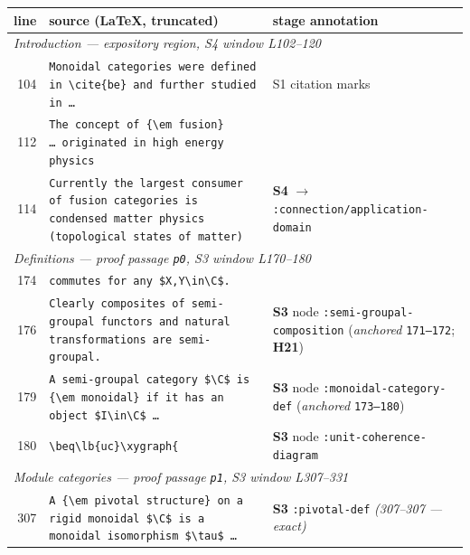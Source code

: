 \begin{center}
\small
\begin{tabular}{r|p{}|p{}}
\textbf{line} & \textbf{source (\LaTeX, truncated)} & \textbf{stage annotation}\\
\hline
\multicolumn{3}{l}{\emph{\quad Introduction --- expository region, S4 window L102--120}}\\
\hline
104 & \texttt{Monoidal categories were defined in \textbackslash cite\{be\} and further studied in \dots} & S1 citation marks\\
112 & \texttt{The concept of \{\textbackslash em fusion\} \dots\ originated in high energy physics} & \\
114 & \texttt{Currently the largest consumer of fusion categories is condensed matter physics (topological states of matter)} & \textbf{S4} $\to$ \texttt{:connection/}\linebreak\texttt{application-domain}\\
\hline
\multicolumn{3}{l}{\emph{\quad Definitions --- proof passage \texttt{p0}, S3 window L170--180}}\\
\hline
174 & \texttt{commutes for any \$X,Y\textbackslash in\textbackslash C\$.} & \\
176 & \texttt{Clearly composites of semi-groupal functors and natural transformations are semi-groupal.} & \textbf{S3} node \texttt{:semi-groupal-}\linebreak\texttt{composition} (\emph{anchored} \texttt{171--172}; \textbf{H21})\\
179 & \texttt{A semi-groupal category \$\textbackslash C\$ is \{\textbackslash em monoidal\} if it has an object \$I\textbackslash in\textbackslash C\$ \dots} & \textbf{S3} node \texttt{:monoidal-}\linebreak\texttt{category-def} (\emph{anchored} \texttt{173--180})\\
180 & \texttt{\textbackslash beq\textbackslash lb\{uc\}\textbackslash xygraph\{} & \textbf{S3} node \texttt{:unit-}\linebreak\texttt{coherence-diagram}\\
\hline
\multicolumn{3}{l}{\emph{\quad Module categories --- proof passage \texttt{p1}, S3 window L307--331}}\\
\hline
307 & \texttt{A \{\textbackslash em pivotal structure\} on a rigid monoidal \$\textbackslash C\$ is a monoidal isomorphism \$\textbackslash tau\$ \dots} & \textbf{S3} \texttt{:pivotal-def} \emph{(307--307 --- exact)}\\

\end{tabular}
\end{center}
